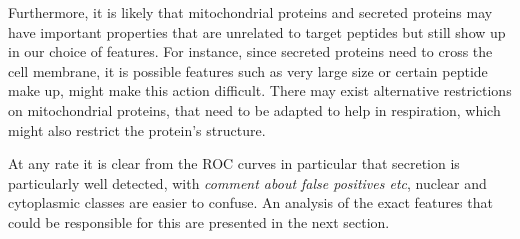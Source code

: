 \documentclass{bioinfo}
\begin{document}
Furthermore, it is likely that mitochondrial proteins and secreted proteins may have important properties that are unrelated to target peptides but still show up in our choice of features. For instance, since secreted proteins need to cross the cell membrane, it is possible features such as very large size or certain peptide make up, might make this action difficult. There may exist alternative restrictions on mitochondrial proteins, that need to be adapted to help in respiration, which might also restrict the protein's structure.

At any rate it is clear from the ROC curves in particular that secretion is particularly well detected, with \textit{comment about false positives etc}, nuclear and cytoplasmic classes are easier to confuse. An analysis of the exact features that could be responsible for this are presented in the next section.


\end{document}
